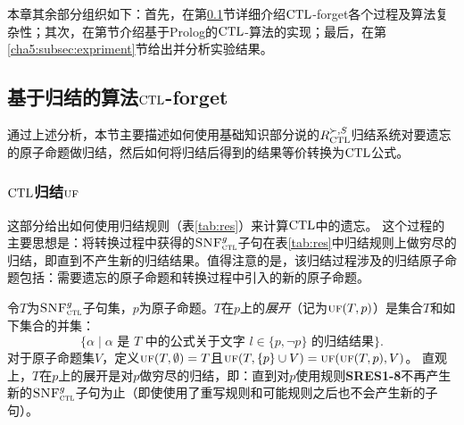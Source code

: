 
本章其余部分组织如下：首先，在第\ref{cha5:subsec:resf}节详细介绍$\textrm{CTL}$-forget各个过程及算法复杂性；其次，在第\label{cha5:subsec:prolog}节介绍基于Prolog的$\textrm{CTL}$-算法的实现；最后，在第\ref{cha5:subsec:expriment}节给出并分析实验结果。
\subsection{基于归结的算法$\textrm{CTL}$-forget}
\label{cha5:subsec:resf}
通过上述分析，本节主要描述如何使用基础知识部分说的$R_{\textrm{CTL}}^{\succ,S}$归结系统对要遗忘的原子命题做归结，然后如何将归结后得到的结果等价转换为$\textrm{CTL}$公式。
\subsubsection{$\textrm{CTL}$归结$\textsc{uf}$}

这部分给出如何使用归结规则（表\ref{tab:res}）来计算$\textrm{CTL}$中的遗忘。
这个过程的主要思想是：将转换过程中获得的${\textsc{SNF}_{\textsc{ctl}}^g}$子句在表\ref{tab:res}中归结规则上做穷尽的归结，即直到不产生新的归结结果。值得注意的是，该归结过程涉及的归结原子命题包括：需要遗忘的原子命题和转换过程中引入的新的原子命题。

令$T$为${\textsc{SNF}_{\textsc{ctl}}^g}$子句集，$p$为原子命题。$T$在$p$上的\emph{展开}（记为$\textsc{uf}(T,p)$）是集合$T$和如下集合的并集：
\[\{\alpha\mid \mbox{$\alpha$ 是 $T$ 中的公式关于文字 $l\in\{p,\neg p\}$ 的归结结果}\}.  \]
对于原子命题集$V$，定义$\textsc{uf}(T,\emptyset)=T$且$\textsc{uf}(T,\{p\}\cup V)=\textsc{uf}(\textsc{uf}(T,p), V)$。
直观上，$T$在$p$上的展开是对$p$做穷尽的归结，即：直到对$p$使用规则{\bf SRES1-8}不再产生新的${\textsc{SNF}_{\textsc{ctl}}^g}$子句为止（即使使用了重写规则和可能规则之后也不会产生新的子句）。


